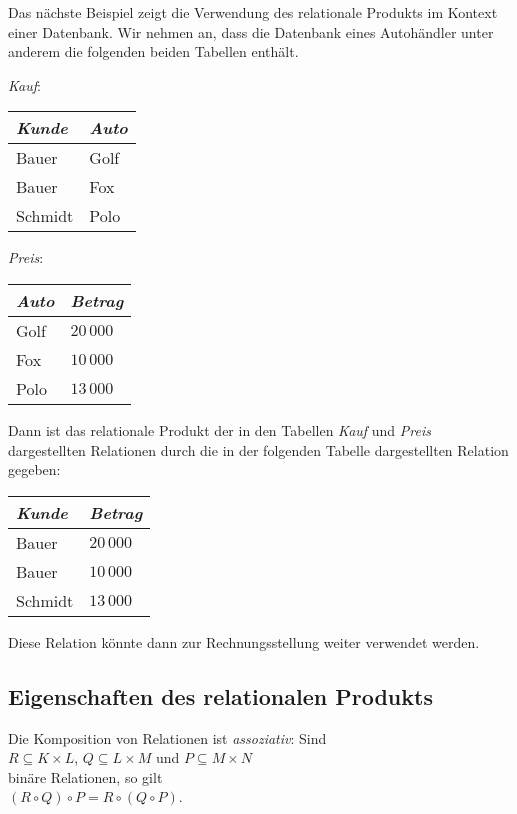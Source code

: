 \example
Das n\"{a}chste Beispiel zeigt die Verwendung des relationale Produkts im Kontext einer
Datenbank.  Wir nehmen an, dass die Datenbank eines Autoh\"{a}ndler unter anderem die
folgenden beiden Tabellen enth\"{a}lt.
\begin{center}
\textsl{Kauf}:  \begin{tabular}[t]{|l|l|}
\hline
\textsl{Kunde} & \textsl{Auto} \\
\hline
\hline
  Bauer   & Golf \\
\hline
  Bauer   & Fox  \\
\hline
  Schmidt & Polo \\
\hline
  \end{tabular}
\qquad \textsl{Preis}:
  \begin{tabular}[t]{|l|l|}
\hline
\textsl{Auto} & \textsl{Betrag} \\
\hline
\hline
  Golf    & $20\,000$ \\
\hline
  Fox     & $10\,000$ \\
\hline
  Polo    & $13\,000$ \\
\hline
  \end{tabular}
\end{center}
Dann ist das relationale Produkt der in den Tabellen \textsl{Kauf} und \textsl{Preis}
dargestellten Relationen durch die in der folgenden Tabelle dargestellten Relation
gegeben:

\begin{center}
  \begin{tabular}[t]{|l|l|}
\hline
\textsl{Kunde} & \textsl{Betrag} \\
\hline
\hline
  Bauer   & $20\,000$ \\
\hline
  Bauer   & $10\,000$ \\
\hline
  Schmidt & $13\,000$ \\
\hline
  \end{tabular} 
\end{center}
Diese Relation k\"{o}nnte dann zur Rechnungsstellung weiter verwendet werden. \eox


\subsection{Eigenschaften des relationalen Produkts}
\begin{Satz}
  Die Komposition von Relationen ist \emph{assoziativ}:  Sind \\[0.2cm]
  \hspace*{1.3cm} 
  $R \subseteq K \times L$, \quad $Q \subseteq L \times M$ \quad und \quad 
  $P \subseteq M \times N$ \\[0.2cm]
  bin\"{a}re Relationen, so gilt \\[0.2cm]
  \hspace*{1.3cm} $(R \circ Q) \circ P = R \circ (Q \circ P)$. 
\end{Satz}


